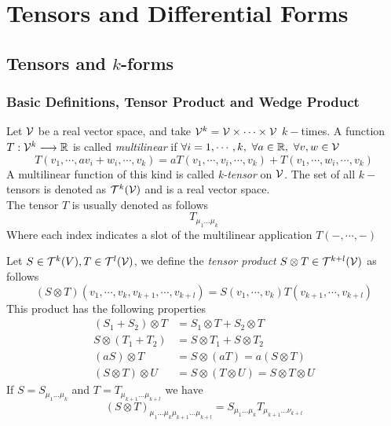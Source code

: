 \documentclass[../complete.tex]{subfiles}
\begin{document}
\section{Tensors and Differential Forms}
\subsection{Tensors and $k$-forms}
\subsubsection{Basic Definitions, Tensor Product and Wedge Product}
\begin{dfn}
	Let $\mathcal{V}$ be a real vector space, and take $\mathcal{V}^k=\mathcal{V}\times\cdots\times\mathcal{V}$ $k-$times. A function $T:\mathcal{V}^k\overset{}{\longrightarrow}\mathbb{R}$ is called \textit{multilinear} if $\forall i=1,\cdots,k,\ \forall a\in\mathbb{R},\ \forall v,w\in\mathcal{V}$
	\begin{equation}
		T(v_1,\cdots,av_i+w_i,\cdots,v_k)=aT(v_1,\cdots,v_i,\cdots,v_k)+T(v_1,\cdots,w_i,\cdots,v_k)
		\label{eq:multilinearapp}
	\end{equation}
	A multilinear function of this kind is called \textit{k-tensor} on $\mathcal{V}$. The set of all $k-$tensors is denoted as $\mathcal{T}^k(\mathcal{V})$ and is a real vector space.\\
	The tensor $T$ is usually denoted as follows
	\begin{equation}
		T_{\mu_1\ldots\mu_k}
		\label{eq:ktensordef}
	\end{equation}
	Where each index indicates a slot of the multilinear application $T(-,\cdots,-)$
\end{dfn}
\begin{dfn}
	Let $S\in\mathcal{T}^k(V),T\in\mathcal{T}^l(\mathcal{V})$, we define the \textit{tensor product} $S\otimes T\in\mathcal{T}^{k+l}(\mathcal{V})$ as follows
	\begin{equation}
		(S\otimes T)(v_1,\cdots,v_k,v_{k+1},\cdots,v_{k+l})=S(v_1,\cdots,v_k)T(v_{k+1},\cdots,v_{k+l})
		\label{eq:tensorprod}
	\end{equation}
	This product has the following properties
	\begin{equation}
		\begin{aligned}
			\left( S_1+S_2 \right)\otimes T&=S_1\otimes T+S_2\otimes T\\
			S\otimes(T_1+T_2)&=S\otimes T_1+S\otimes T_2\\
			(aS)\otimes T&=S\otimes(aT)=a(S\otimes T)\\
			(S\otimes T)\otimes U&= S\otimes(T\otimes U)=S\otimes T\otimes U
		\end{aligned}
		\label{eq:properties}
	\end{equation}
	If $S=S_{\mu_1\ldots\mu_k}$ and $T=T_{\mu_{k+1}\ldots\mu_{k+l}}$ we have
	\begin{equation}
		(S\otimes T)_{\mu_1\ldots\mu_k\mu_{k+1}\ldots\mu_{k+l}}=S_{\mu_1\ldots\mu_k}T_{\mu_{k+1}\ldots\nu_{k+l}}
		\label{eq:tensorprodein}
	\end{equation}
\end{dfn}
\end{document}
